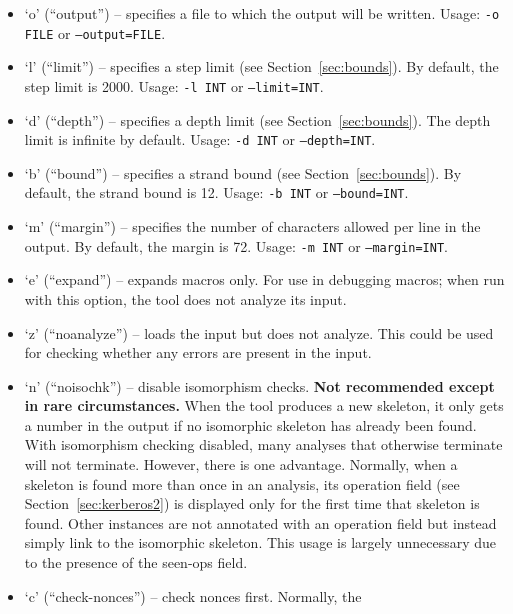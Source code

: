 \begin{itemize}
\item `o' (``output'') -- specifies a file to which the output will be written.
  Usage: \texttt{-o FILE} or \texttt{--output=FILE}.
   
\item `l' (``limit'') -- specifies a step limit (see
  Section~\ref{sec:bounds}).  By default, the step limit is 2000.
  Usage: \texttt{-l INT} or \texttt{--limit=INT}.
   
\item `d' (``depth'') -- specifies a depth limit (see
  Section~\ref{sec:bounds}).  The depth limit is infinite by default.
  Usage: \texttt{-d INT} or
  \texttt{--depth=INT}.  
\item `b' (``bound'') -- specifies a strand bound (see Section~\ref{sec:bounds}).
  By default, the strand bound is 12.
  Usage: \texttt{-b INT} or \texttt{--bound=INT}.
\item `m' (``margin'') -- specifies the number of characters allowed
  per line in the output. By default, the margin is 72.
  Usage: \texttt{-m INT} or \texttt{--margin=INT}.
\item `e' (``expand'') -- expands macros only.  For use in debugging
  macros; when run with this option, the tool does not analyze its
  input.
\item `z' (``noanalyze'') -- loads the input but does not analyze.
    This could be used for checking whether any errors are present in
    the input.
\item `n' (``noisochk'') -- disable isomorphism checks.  {\bf Not
  recommended except in rare circumstances.}  When the tool produces a
  new skeleton, it only gets a number in the output if no isomorphic
  skeleton has already been found.  With isomorphism checking
  disabled, many analyses that otherwise terminate will not terminate.
  However, there is one advantage.   Normally, when
  a skeleton is found more than once in an analysis, its operation
  field (see Section~\ref{sec:kerberos2}) is displayed only for the
  first time that skeleton is found.  Other instances are not
  annotated with an operation field but instead simply link to the
  isomorphic skeleton. This usage is largely unnecessary due to the
  presence of the seen-ops field. 
 
\item `c' (``check-nonces'') -- check nonces first.  Normally, the

\end{itemize}
